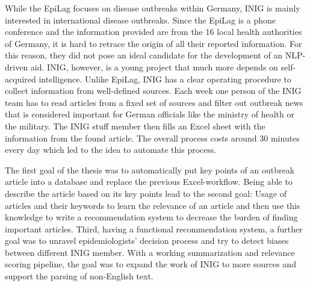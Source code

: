 While the EpiLag focuses on disease outbreaks within Germany, INIG is mainly interested in international disease outbreaks. Since the EpiLag is a phone conference and the information provided are from the 16 local health authorities of Germany, it is hard to retrace the origin of all their reported information.
For this reason, they did not pose an ideal candidate for the development of an NLP-driven aid. %
INIG, however, is a young project that much more depends on self-acquired intelligence.
Unlike EpiLag, INIG has a clear operating procedure to collect information from well-defined sources.
Each week one person of the INIG team has to read articles from a fixed set of sources and filter out outbreak news that is considered important for German officials like the ministry of health or the military.
The INIG stuff member then fills an Excel sheet with the information from the found article.
The overall process costs around 30 minutes every day which led to the idea to automate this process.

The first goal of the thesis was to automatically put key points of an outbreak article into a database and replace the previous Excel-workflow. Being able to describe the article based on its key points lead to the second goal: Usage of articles and their keywords to learn the relevance of an article and then use this knowledge to write a recommendation system to decrease the burden of finding important articles.
Third, having a functional recommendation system, a further goal was to unravel epidemiologists' decision process and try to detect biases between different INIG member.
With a working summarization and relevance scoring pipeline, the goal was to expand the work of INIG to more sources and support the parsing of non-English text.
